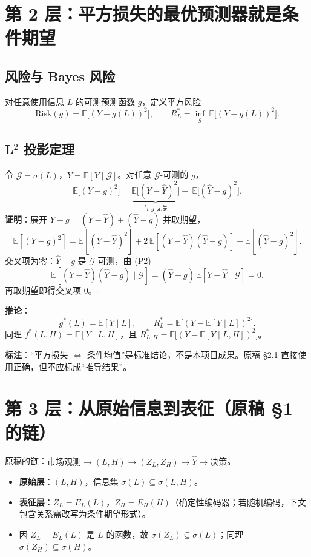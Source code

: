 \documentclass[UTF8,11pt,a4paper]{ctexart}
\newcommand{\E}{\mathbb{E}}
\begin{document}
\section{第 2 层：平方损失的最优预测器就是条件期望}

\subsection{风险与 Bayes 风险}
对任意使用信息 $L$ 的可测预测函数 $g$，定义平方风险
\[
\mathrm{Risk}(g)=\E\big[(Y-g(L))^2\big],\qquad
R_L^*=\inf_g\ \E\big[(Y-g(L))^2\big].
\]

\subsection{L$^2$ 投影定理}
令 $\mathcal G=\sigma(L)$，$\hat Y=\E[Y\mid\mathcal G]$。对任意 $\mathcal G$-可测的 $g$，
\[
\E\big[(Y-g)^2\big]=\underbrace{\E\big[(Y-\hat Y)^2\big]}_{\text{与 }g\text{ 无关}}+\ \E\big[(\hat Y-g)^2\big].
\]
\textbf{证明}：展开 $Y-g=(Y-\hat Y)+(\hat Y-g)$ 并取期望，
\[
\E[(Y-g)^2]=\E[(Y-\hat Y)^2]+2\,\E[(Y-\hat Y)(\hat Y-g)]+\E[(\hat Y-g)^2].
\]
交叉项为零：$\hat Y-g$ 是 $\mathcal G$-可测，由 (P2)
\[
\E[(Y-\hat Y)(\hat Y-g)\mid\mathcal G]=(\hat Y-g)\,\E[Y-\hat Y\mid\mathcal G]=0 .
\]
再取期望即得交叉项 $0$。$\square$

\textbf{推论}：
\[
\boxed{\,g^*(L)=\E[Y\mid L],\qquad R_L^*=\E\big[(Y-\E[Y\mid L])^2\big].\,}
\]
同理 $f^*(L,H)=\E[Y\mid L,H]$，且 $R_{L,H}^*=\E\big[(Y-\E[Y\mid L,H])^2\big]$。

\textbf{标注}：``平方损失 $\Leftrightarrow$ 条件均值''是标准结论，不是本项目成果。原稿 §2.1 直接使用正确，但不应标成``推导结果''。

\section{第 3 层：从原始信息到表征（原稿 §1 的链）}

原稿的链：$\text{市场观测}\to(L,H)\to(Z_L,Z_H)\to\widehat Y\to\text{决策}$。

\begin{itemize}
  \item \textbf{原始层}：$(L,H)$，信息集 $\sigma(L)\subseteq\sigma(L,H)$。
  \item \textbf{表征层}：$Z_L=E_L(L)$，$Z_H=E_H(H)$（确定性编码器；若随机编码，下文包含关系需改写为条件期望形式）。
  \item 因 $Z_L=E_L(L)$ 是 $L$ 的函数，故 $\sigma(Z_L)\subseteq\sigma(L)$；同理 $\sigma(Z_H)\subseteq\sigma(H)$。
\end{itemize}
\end{document}
